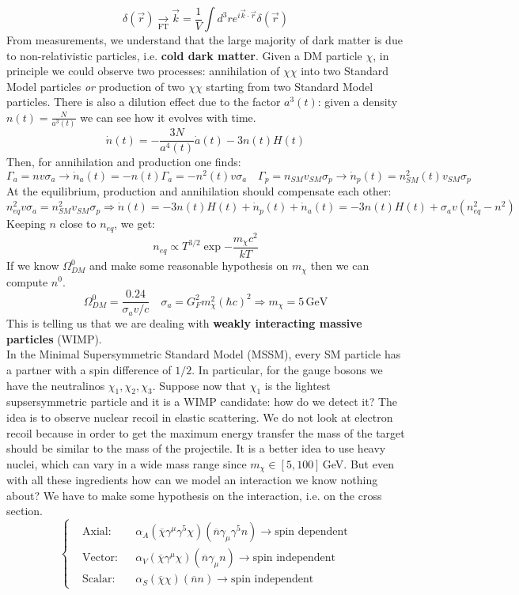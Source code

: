 \documentclass[10.75pt,a4paper,openright,bottom=2cm]{article}
\begin{document}
\[
\delta(\Vec{r})\xrightarrow[\text{FT}]{}\Vec{k}=\frac{1}{V}\int d^3re^{i\Vec{k}\cdot\Vec{r}}\delta(\Vec{r})
\]
From measurements, we understand that the large majority of dark matter is due to non-relativistic particles, i.e. \textbf{cold dark matter}. Given a DM particle $\chi$, in principle we could observe two processes: annihilation of $\chi\chi$ into two Standard Model particles \textit{or} production of two $\chi\chi$ starting from two Standard Model particles. There is also a dilution effect due to the factor $a^3(t)$: given a density $n(t)=\frac{N}{a^3(t)}$ we can see how it evolves with time.
\[
\Dot{n}(t)=-\frac{3N}{a^4(t)}\Dot{a}(t)-3n(t)H(t)
\]
Then, for annihilation and production one finds:
\[
\Gamma_a=nv\sigma_a\to\Dot{n}_a(t)=-n(t)\Gamma_a=-n^2(t)v\sigma_a \quad \Gamma_p=n_{SM}v_{SM}\sigma_p\to\Dot{n}_p(t)=n^2_{SM}(t)v_{SM}\sigma_p
\]
At the equilibrium, production and annihilation should compensate each other:
\[
n_{eq}^2v\sigma_a=n_{SM}^2v_{SM}\sigma_p\Rightarrow\Dot{n}(t)=-3n(t)H(t)+\Dot{n}_p(t)+\Dot{n}_a(t)=-3n(t)H(t)+\sigma_av(n_{eq}^2-n^2)
\]
Keeping $n$ close to $n_{eq}$, we get:
\[
n_{eq}\propto T^{3/2}\exp{-\frac{m_\chi c^2}{kT}}
\]
If we know $\Omega_{DM}^0$ and make some reasonable hypothesis on $m_\chi$ then we can compute $n^0$.
\[
\Omega_{DM}^0=\frac{0.24}{\sigma_av/c} \quad \sigma_a=G_F^2m_\chi^2(\hbar c)^2 \Rightarrow m_\chi=5\,\text{GeV}
\]
This is telling us that we are dealing with \textbf{weakly interacting massive particles} (WIMP).\\
In the Minimal Supersymmetric Standard Model (MSSM), every SM particle has a partner with a spin difference of $1/2$. In particular, for the gauge bosons we have the neutralinos $\chi_1, \chi_2, \chi_3$. Suppose now that $\chi_1$ is the lightest supsersymmetric particle and it is a WIMP candidate: how do we detect it? The idea is to observe nuclear recoil in elastic scattering. We do not look at electron recoil because in order to get the maximum energy transfer the mass of the target should be similar to the mass of the projectile. It is a better idea to use heavy nuclei, which can vary in a wide mass range since $m_\chi\in[5,100]$\,GeV. But even with all these ingredients how can we model an interaction we know nothing about? We have to make some hypothesis on the interaction, i.e. on the cross section.
\[
\left\{
\begin{aligned}
&\text{Axial:}&&\alpha_A(\overline{\chi}\gamma^\mu\gamma^5\chi)(\overline{n}\gamma_\mu\gamma^5n)\to\text{spin dependent}\\
&\text{Vector:}&&\alpha_V(\overline{\chi}\gamma^\mu\chi)(\overline{n}\gamma_\mu n)\to\text{spin independent}\\
&\text{Scalar:}&&\alpha_S(\overline{\chi}\chi)(\overline{n}n)\to\text{spin independent}
\end{aligned}
\right.
\]
\end{document}
